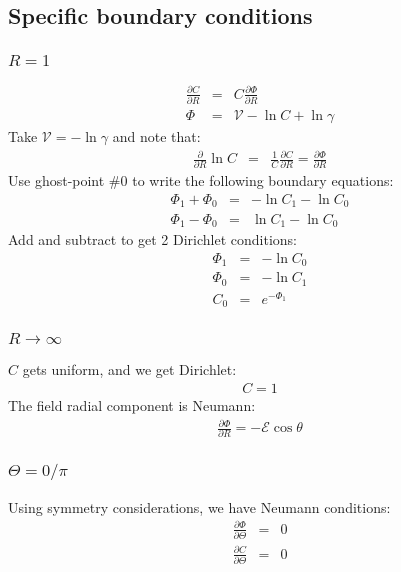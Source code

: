 \documentclass[11pt]{article}
\begin{document}
\subsection{Specific boundary conditions}
\subsubsection{$R = 1$}
\begin{eqnarray}
  \frac{\partial C}{\partial R} &=&
   C \frac{\partial \varPhi}{\partial R} \\
  \varPhi &=& \mathscr{V} - \ln C + \ln \gamma
\end{eqnarray}
Take $\mathscr{V} = -\ln \gamma$ and note that:
\begin{eqnarray}
  \frac{\partial}{\partial R} \ln C &=&
  \frac{1}{C}\frac{\partial C}{\partial R} =
  \frac{\partial \varPhi}{\partial R}
\end{eqnarray}
Use ghost-point \#0 to write the following boundary equations:
\begin{eqnarray}
  \varPhi_1 + \varPhi_0 &=& - \ln C_1 - \ln C_0 \\
  \varPhi_1 - \varPhi_0 &=& \ln C_1 - \ln C_0
\end{eqnarray}
Add and subtract to get 2 Dirichlet conditions:
\begin{eqnarray}
  \varPhi_1 &=& - \ln C_0 \\
  \varPhi_0 &=& - \ln C_1 \\
  C_0 &=& e^{-\varPhi_1}
\end{eqnarray}
\subsubsection{$R \rightarrow \infty$}
$C$ gets uniform, and we get Dirichlet:
\begin{eqnarray}
 C = 1
\end{eqnarray}
The field radial component is Neumann:
\begin{eqnarray}
 \frac{\partial \varPhi}{\partial R} = -\mathscr{E} \cos \theta
\end{eqnarray}
\subsubsection{$\Theta = 0/\pi$}
Using symmetry considerations, we have Neumann conditions:
\begin{eqnarray}
 \frac{\partial \varPhi}{\partial \Theta} &=& 0 \\
 \frac{\partial C}{\partial \Theta} &=& 0 \\
\end{eqnarray}
\end{document}
